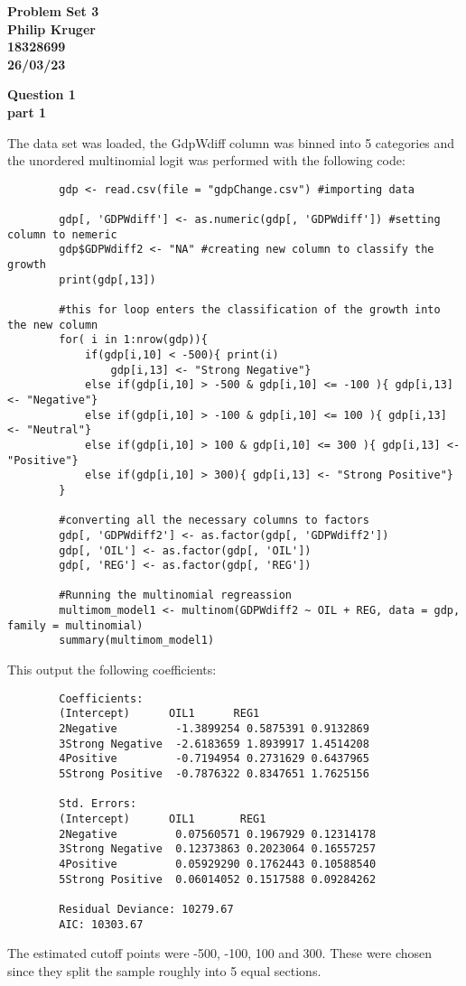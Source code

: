 \documentclass{article}
\begin{document}
	
	\begin{center}
		\textbf{
			{\LARGE Problem Set 3}\\
			Philip Kruger\\
			18328699\\
			26/03/23\\
		}
	\end{center}
	\vspace{10mm}
	\textbf{\Large Question 1\\}
	\textbf{part 1\\}
	
	The data set was loaded, the GdpWdiff column was binned into 5 categories and the unordered multinomial logit was performed with the following code:
	\begin{verbatim}
		gdp <- read.csv(file = "gdpChange.csv") #importing data
		
		gdp[, 'GDPWdiff'] <- as.numeric(gdp[, 'GDPWdiff']) #setting column to nemeric
		gdp$GDPWdiff2 <- "NA" #creating new column to classify the growth
		print(gdp[,13])
		
		#this for loop enters the classification of the growth into the new column
		for( i in 1:nrow(gdp)){
			if(gdp[i,10] < -500){ print(i)
				gdp[i,13] <- "Strong Negative"}
			else if(gdp[i,10] > -500 & gdp[i,10] <= -100 ){ gdp[i,13] <- "Negative"}
			else if(gdp[i,10] > -100 & gdp[i,10] <= 100 ){ gdp[i,13] <- "Neutral"}
			else if(gdp[i,10] > 100 & gdp[i,10] <= 300 ){ gdp[i,13] <- "Positive"}
			else if(gdp[i,10] > 300){ gdp[i,13] <- "Strong Positive"}
		}
		
		#converting all the necessary columns to factors
		gdp[, 'GDPWdiff2'] <- as.factor(gdp[, 'GDPWdiff2'])
		gdp[, 'OIL'] <- as.factor(gdp[, 'OIL'])
		gdp[, 'REG'] <- as.factor(gdp[, 'REG'])
		
		#Running the multinomial regreassion
		multimom_model1 <- multinom(GDPWdiff2 ~ OIL + REG, data = gdp, family = multinomial)
		summary(multimom_model1)
	\end{verbatim}
	This output the following coefficients:
	\begin{verbatim}
		Coefficients:
		(Intercept)      OIL1      REG1
		2Negative         -1.3899254 0.5875391 0.9132869
		3Strong Negative  -2.6183659 1.8939917 1.4514208
		4Positive         -0.7194954 0.2731629 0.6437965
		5Strong Positive  -0.7876322 0.8347651 1.7625156
		
		Std. Errors:
		(Intercept)      OIL1       REG1
		2Negative         0.07560571 0.1967929 0.12314178
		3Strong Negative  0.12373863 0.2023064 0.16557257
		4Positive         0.05929290 0.1762443 0.10588540
		5Strong Positive  0.06014052 0.1517588 0.09284262
		
		Residual Deviance: 10279.67
		AIC: 10303.67 
	\end{verbatim}
The estimated cutoff points were -500, -100, 100 and 300. These were chosen since they split the sample roughly into 5 equal sections.\\
\end{document}
